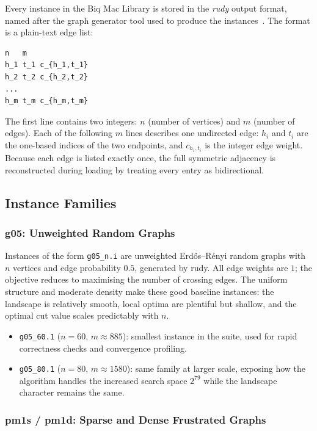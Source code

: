 \documentclass[12pt]{article}
\begin{document}
Every instance in the Biq Mac Library is stored in the \emph{rudy} output format,
named after the graph generator tool used to produce the instances~\cite{rudy}.
The format is a plain-text edge list:

\begin{verbatim}
n   m
h_1 t_1 c_{h_1,t_1}
h_2 t_2 c_{h_2,t_2}
...
h_m t_m c_{h_m,t_m}
\end{verbatim}

\noindent
The first line contains two integers: $n$ (number of vertices) and $m$ (number of
edges). Each of the following $m$ lines describes one undirected edge: $h_i$ and
$t_i$ are the one-based indices of the two endpoints, and $c_{h_i,t_i}$ is the
integer edge weight. Because each edge is listed exactly once, the full symmetric
adjacency is reconstructed during loading by treating every entry as bidirectional.

\subsection{Instance Families}

\subsubsection*{g05: Unweighted Random Graphs}

Instances of the form \texttt{g05\_n.i} are unweighted Erd\H{o}s--R\'enyi random
graphs with $n$ vertices and edge probability $0.5$, generated by rudy.
All edge weights are $1$; the objective reduces to maximising the number of crossing
edges.
The uniform structure and moderate density make these good baseline instances: the
landscape is relatively smooth, local optima are plentiful but shallow, and the
optimal cut value scales predictably with $n$.

\begin{itemize}
    \item \texttt{g05\_60.1} ($n=60$, $m\approx885$): smallest instance in the
          suite, used for rapid correctness checks and convergence profiling.
    \item \texttt{g05\_80.1} ($n=80$, $m\approx1580$): same family at larger
          scale, exposing how the algorithm handles the increased search space
          $2^{79}$ while the landscape character remains the same.
\end{itemize}

\subsubsection*{pm1s / pm1d: Sparse and Dense Frustrated Graphs}
\end{document}
